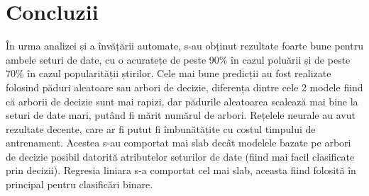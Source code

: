 \documentclass{article}
\begin{document}
\section{Concluzii}
În urma analizei și a învățării automate, s-au obținut rezultate foarte bune
pentru ambele seturi de date, cu o acuratețe de peste 90\% în cazul poluării
și de peste 70\% în cazul popularității știrilor. Cele mai bune predicții au 
fost realizate folosind păduri aleatoare sau arbori de decizie, diferența dintre
cele 2 modele fiind că arborii de decizie sunt mai rapizi, dar pădurile 
aleatoarea scalează mai bine la seturi de date mari, putând fi mărit numărul de
arbori. Rețelele neurale au avut rezultate decente, care ar fi putut fi 
îmbunătățite cu costul timpului de antrenament. Acestea s-au comportat mai slab 
decât modelele bazate pe arbori de decizie posibil datorită atributelor 
seturilor de date (fiind mai facil clasificate prin decizii). Regresia liniara
s-a comportat cel mai slab, aceasta fiind folosită în principal pentru 
clasificări binare.
\end{document}
